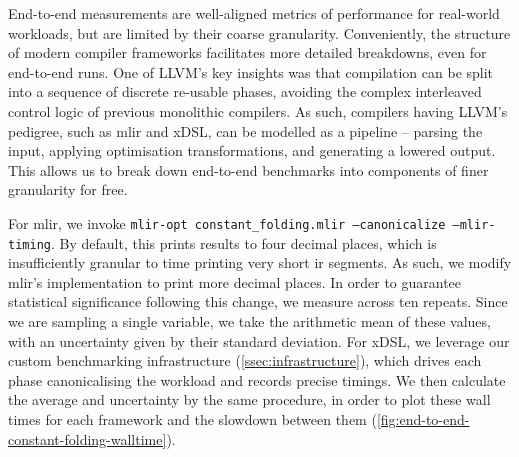 End-to-end measurements are well-aligned metrics of performance for real-world workloads, but are limited by their coarse granularity. Conveniently, the structure of modern compiler frameworks facilitates more detailed breakdowns, even for end-to-end runs.
One of LLVM's key insights was that compilation can be split into a sequence of discrete re-usable phases, avoiding the complex interleaved control logic of previous monolithic compilers.
As such, compilers having LLVM's pedigree, such as \ac{mlir} and xDSL, can be modelled as a pipeline -- parsing the input, applying optimisation transformations, and generating a lowered output.
This allows us to break down end-to-end benchmarks into components of finer granularity for free.

For \ac{mlir}, we invoke \texttt{mlir-opt constant_folding.mlir --canonicalize --mlir-timing}.
By default, this prints results to four decimal places, which is insufficiently granular to time printing very short \ac{ir} segments. As such, we modify \ac{mlir}'s implementation to print more decimal places. In order to guarantee statistical significance following this change, we measure across ten repeats. Since we are sampling a single variable, we take the arithmetic mean of these values, with an uncertainty given by their standard deviation.
For xDSL, we leverage our custom benchmarking infrastructure (\autoref{ssec:infrastructure}), which drives each phase canonicalising the workload and records precise timings.
We then calculate the average and uncertainty by the same procedure, in order to plot these wall times for each framework and the slowdown between them (\autoref{fig:end-to-end-constant-folding-walltime}).

